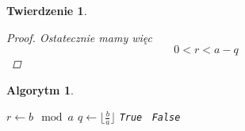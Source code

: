 \documentclass[12pt]{article}
\newtheorem*{theorem*}{Twierdzenie}
\newtheorem*{algorithm*}{Algorytm}
\begin{document}
\begin{titlepage}
\begin{theorem*}
\begin{proof}
Ostatecznie mamy więc
$$0 < r < a - q$$
\end{proof}

\end{theorem*}

\begin{algorithm*}$ $\\
\begin{algorithmic}
    \State $r \gets b \mod a$
    \State $q \gets \lfloor \frac{b}{a} \rfloor$
        \Return \texttt{True}
    \Else $\,$
        \Return \texttt{False}
    \EndIf
\end{algorithmic}
\end{algorithm*}

\end{titlepage}
\end{document}
